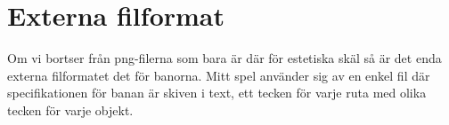 \documentclass{TDP005mall}
\begin{document}
\section{Externa filformat}
Om vi bortser från png-filerna som bara är där för estetiska skäl så är det enda externa filformatet det för banorna.
Mitt spel använder sig av en enkel fil där specifikationen för banan är skiven i text, ett tecken för varje ruta med olika tecken för varje objekt.
\end{document}
